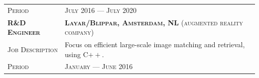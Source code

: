 \documentclass[a4paper, oneside, final]{scrartcl}
\newcommand{\gray}{\rowcolor[gray]{.90}}
\begin{document}
\begin{center}
\begin{tabular}{p{3.5cm}@{\hskip 0.3in}p{12.3cm}}
			\textsc{Period}                     & \textsc{July 2016 --- July 2020} 
            \vspace{5px}\\
            \gray \textsc{\textbf{R\&D Engineer}}   & \textsc{\textbf{Layar\slash Blippar, Amsterdam, NL} (augmented reality company)}\\
            \textsc{Job Description}                & Focus on efficient large-scale image matching and retrieval, using C${++}$.\\
			\textsc{Period}                         & \textsc{January --- June 2016} 
		\end{tabular}

\end{center}
\end{document}
